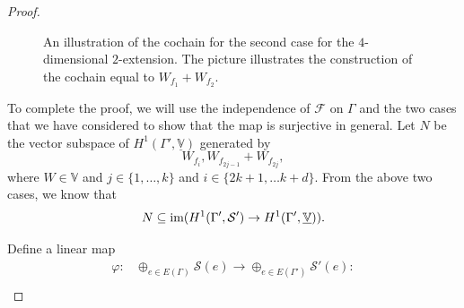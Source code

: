 \documentclass{article}
\theoremstyle{definition}
\theoremstyle{remark}
\newcommand{\im}{\textup{im}}
\begin{document}
\begin{proof}
\begin{figure}[h!]
\caption{An illustration of the cochain for the second case for the $4$-dimensional $2$-extension. The picture illustrates the construction of the cochain equal to $W_{f_1} + W_{f_2}$.}
\label{fig: proof_case_2}
\end{figure}
To complete the proof, we will use the independence of $\mathcal{F}$ on $\Gamma$ and the two cases that we have considered to show that the map is surjective in general. Let $N$ be the vector subspace of $H^{1}(\Gamma', \underline{\mathbb{V}})$ generated by 
\begin{equation*}
    W_{f_{i}}, W_{f_{2j-1}} + W_{f_{2j}},
\end{equation*}
  where $W\in \mathbb{V}$ and $j\in \{1, \dots, k\}$ and $i \in \{2k+1, \dots k + d\}$. From the above two cases, we know that
  \begin{equation*}
  N \subseteq \im(H^{1}(\Gamma', \mathcal{S}') \rightarrow H^{1}(\Gamma', \underline{\mathbb{V}})).
  \end{equation*}

Define a linear map
\begin{equation*}
\begin{array}{cl}
   \varphi: & \oplus_{e \in E(\Gamma)}  \mathcal{S}(e) \rightarrow \oplus_{e \in E(\Gamma')} \mathcal{S}'(e):\\
   

\end{array}
\end{equation*}
\end{proof}
\end{document}
